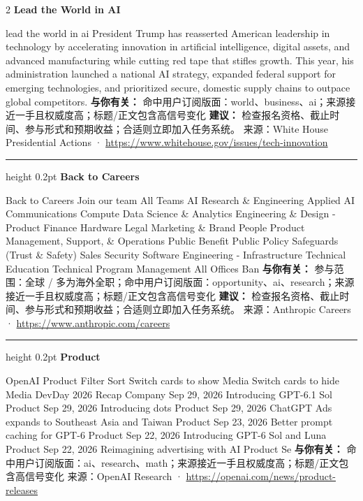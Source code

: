 \documentclass[10.5pt]{ctexart}
\begin{document}
\begin{multicols}{2}
{\large\bfseries Lead the World in AI}\par
lead the world in ai President Trump has reasserted American leadership in technology by accelerating innovation in artificial intelligence, digital assets, and advanced manufacturing while cutting red tape that stifles growth. This year, his administration launched a national AI strategy, expanded federal support for emerging technologies, and prioritized secure, domestic supply chains to outpace global competitors.
\textbf{与你有关：} 命中用户订阅版面：world、business、ai；来源接近一手且权威度高；标题/正文包含高信号变化
\textbf{建议：} 检查报名资格、截止时间、参与形式和预期收益；合适则立即加入任务系统。
{\footnotesize\color{ormuted} 来源：White House Presidential Actions · \url{https://www.whitehouse.gov/issues/tech-innovation}}
\vspace{2mm}
\hrule height 0.2pt
\vspace{2mm}
{\large\bfseries Back to Careers}\par
Back to Careers Join our team All Teams AI Research \& Engineering Applied AI Communications Compute Data Science \& Analytics Engineering \& Design - Product Finance Hardware Legal Marketing \& Brand People Product Management, Support, \& Operations Public Benefit Public Policy Safeguards (Trust \& Safety) Sales Security Software Engineering - Infrastructure Technical Education Technical Program Management All Offices Ban
\textbf{与你有关：} 参与范围：全球 / 多为海外全职；命中用户订阅版面：opportunity、ai、research；来源接近一手且权威度高；标题/正文包含高信号变化
\textbf{建议：} 检查报名资格、截止时间、参与形式和预期收益；合适则立即加入任务系统。
{\footnotesize\color{ormuted} 来源：Anthropic Careers · \url{https://www.anthropic.com/careers}}
\vspace{2mm}
\hrule height 0.2pt
\vspace{2mm}
{\large\bfseries Product}\par
OpenAI Product Filter Sort Switch cards to show Media Switch cards to hide Media DevDay 2026 Recap Company Sep 29, 2026 Introducing GPT-6.1 Sol Product Sep 29, 2026 Introducing dots Product Sep 29, 2026 ChatGPT Ads expands to Southeast Asia and Taiwan Product Sep 23, 2026 Better prompt caching for GPT-6 Product Sep 22, 2026 Introducing GPT-6 Sol and Luna Product Sep 22, 2026 Reimagining advertising with AI Product Se
\textbf{与你有关：} 命中用户订阅版面：ai、research、math；来源接近一手且权威度高；标题/正文包含高信号变化
{\footnotesize\color{ormuted} 来源：OpenAI Research · \url{https://openai.com/news/product-releases}}

\end{multicols}
\end{document}
